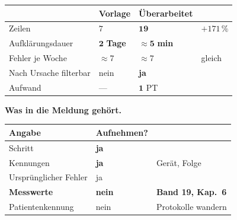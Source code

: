 \begin{merksatz}
\begin{center}
{\small
\renewcommand{\arraystretch}{1.45}
\begin{tabular}{@{}P{3.0cm}P{1.8cm}P{2.2cm}P{1.8cm}@{}}
\toprule
& \textbf{Vorlage} & \textbf{Überarbeitet} & \\
\midrule
Zeilen & $7$ & $\mathbf{19}$ & $+171\,\%$\\
Aufklärungsdauer & \textcolor{akzent}{$\mathbf{2}$ \textbf{Tage}} & \textcolor{gruen}{$\approx\mathbf{5}$ \textbf{min}} & \\
Fehler je Woche & $\approx7$ & $\approx7$ & \textcolor{gruen}{gleich}\\
Nach Ursache filterbar & \textcolor{akzent}{nein} & \textcolor{gruen}{\textbf{ja}} & \\
Aufwand & --- & $\mathbf{1}$ PT & \\
\bottomrule
\end{tabular}}
\end{center}

\begin{center}
\begin{minipage}{0.88\textwidth}
\end{minipage}
\end{center}

\textbf{Was in die Meldung gehört.}

\begin{center}
\renewcommand{\arraystretch}{1.45}
\begin{tabular}{@{}P{3.0cm}P{2.4cm}P{2.4cm}@{}}
\toprule
\textbf{Angabe} & \textbf{Aufnehmen?} & \\
\midrule
Schritt & \textcolor{gruen}{\textbf{ja}} & \\
Kennungen & \textcolor{gruen}{\textbf{ja}} & \textcolor{gruen}{Gerät, Folge}\\
Ursprünglicher Fehler & \textcolor{gruen}{ja} & \\
\textbf{Messwerte} & \textcolor{akzent}{\textbf{nein}} & \textcolor{akzent}{\textbf{Band 19, Kap.~6}}\\
Patienten\-kennung & \textcolor{akzent}{nein} & \textcolor{akzent}{Protokolle wandern}\\
\bottomrule
\end{tabular}
\end{center}

\begin{center}
\end{center}
\end{merksatz}

